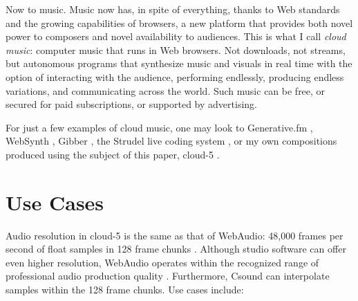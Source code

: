 \documentclass[runningheads,a4paper]{llncs}
\begin{document}
Now to music. Music now has, in spite of everything, thanks to Web standards and the growing capabilities of browsers, a new platform that provides both novel power to composers and novel availability to audiences. This is what I call \emph{cloud music}: computer music that runs in Web browsers. Not downloads, not streams, but autonomous programs that synthesize music and visuals in real time with the option of interacting with the audience, performing endlessly, producing endless variations, and communicating across the world. Such music can be free, or secured for paid subscriptions, or supported by advertising. 

For just a few examples of cloud music, one may look to Generative.fm \cite{alexbainter}, WebSynth \cite{websynth}, Gibber \cite{gibber}, the Strudel live coding system \cite{strudel}, or my own compositions produced using the subject of this paper, cloud-5 \cite{cloud5}.

\section{Use Cases}

Audio resolution in cloud-5 is the same as that of WebAudio: 48,000 frames per second of float samples in 128 frame chunks \cite{webaudiostandard}. Although studio software can offer even higher resolution, WebAudio operates within the recognized range of professional audio production quality \cite{katz} \cite{bassal}. Furthermore, Csound can interpolate samples within the 128 frame chunks. Use cases include:
\end{document}
